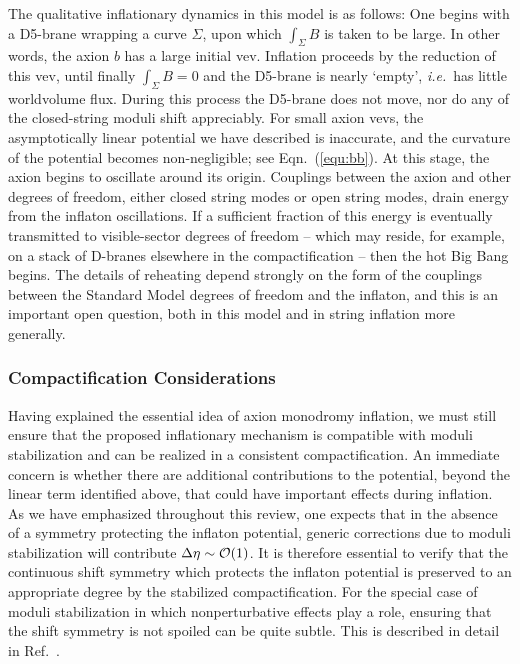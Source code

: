 \documentclass[12pt,letterpaper,rotate]{article}
\begin{document}
{\vskip 6pt
The qualitative inflationary dynamics in this model is as follows:  One begins with a D5-brane wrapping a curve $\Sigma$, upon which $ \int_\Sigma B$  is taken to be large.  In other words, the axion $b$ has a large initial vev.  Inflation proceeds by the reduction of this vev, until finally $\int_\Sigma B = 0$  and the D5-brane is
nearly `empty', {\it i.e.}~has little worldvolume flux.  During this process the D5-brane does not move, nor do any of the closed-string moduli shift appreciably.  For small axion vevs, the asymptotically linear potential we have described is inaccurate, and the curvature of the potential becomes non-negligible; see Eqn.~(\ref{equ:bb}).
At this stage, the axion begins to oscillate around its origin.  Couplings between the axion and other degrees of freedom, either closed string modes or open string modes, drain energy from the inflaton oscillations.  If a sufficient fraction of this energy is eventually transmitted to visible-sector degrees of freedom -- which may reside, for example, on a stack of D-branes elsewhere in the compactification --  then the hot Big Bang begins.  The details of reheating depend strongly on the form of the couplings between the Standard Model degrees of freedom and the inflaton, and this is an important open question, both in this model and in string inflation more generally. 


\subsubsection{Compactification Considerations}

Having explained the essential idea of axion monodromy inflation, we must still ensure that the proposed inflationary mechanism is compatible with moduli stabilization and can be realized in a consistent compactification.  An immediate concern is whether there are additional contributions to the potential, beyond the linear term identified above, that could have important effects during inflation. As we
have
emphasized throughout this review, one expects that in the absence of a symmetry protecting the inflaton potential, generic corrections due to moduli stabilization will contribute $\Delta\eta\sim {\cal O}(1)$.
It is therefore essential to verify that the continuous shift symmetry which protects the inflaton potential is
preserved to an appropriate degree by the stabilized compactification.
For the special case of moduli stabilization in which nonperturbative effects play a role, ensuring that the shift symmetry is not spoiled can be quite subtle.  
This is described in detail in Ref.~\cite{MSW}.



}
\end{document}
